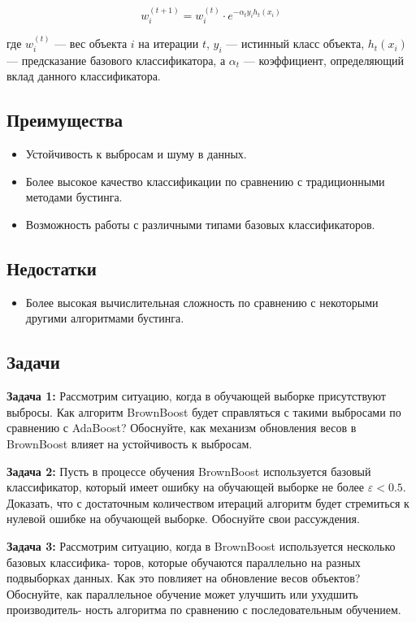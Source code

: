 $$
    w_i^{(t+1)} = w_i^{(t)} \cdot e^{-\alpha_t y_i h_t(x_i)}
$$

где $w_i^{(t)}$ — вес объекта $i$ на итерации $t$, $y_i$ — истинный класс объекта, $h_t(x_i)$ — предсказание базового классификатора, а $\alpha_t$ — коэффициент, определяющий вклад данного классификатора.

\subsection*{Преимущества}
\begin{itemize}
    \item Устойчивость к выбросам и шуму в данных.
    \item Более высокое качество классификации по сравнению с традиционными методами бустинга.
    \item Возможность работы с различными типами базовых классификаторов.
\end{itemize}

\subsection*{Недостатки}
\begin{itemize}
    \item Более высокая вычислительная сложность по сравнению с некоторыми другими алгоритмами бустинга.
\end{itemize}

\subsection*{Задачи}

\textbf{Задача 1:} Рассмотрим ситуацию, когда в обучающей выборке присутствуют выбросы. Как алгоритм
BrownBoost будет справляться с такими выбросами по сравнению с AdaBoost? Обоснуйте, как механизм
обновления весов в BrownBoost влияет на устойчивость к выбросам.

\textbf{Задача 2:} Пусть в процессе обучения BrownBoost используется базовый классификатор, который
имеет ошибку на обучающей выборке не более $\varepsilon < 0.5$. Доказать, что с достаточным количеством итераций
алгоритм будет стремиться к нулевой ошибке на обучающей выборке. Обоснуйте свои рассуждения.

\textbf{Задача 3:} Рассмотрим ситуацию, когда в BrownBoost используется несколько базовых классифика-
торов, которые обучаются параллельно на разных подвыборках данных. Как это повлияет на обновление
весов объектов? Обоснуйте, как параллельное обучение может улучшить или ухудшить производитель-
ность алгоритма по сравнению с последовательным обучением.
